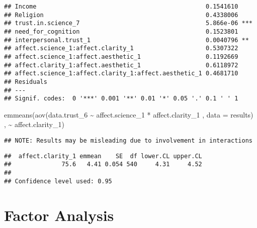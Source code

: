 \documentclass[
]{article}
\newenvironment{Shaded}{\begin{snugshade}}{\end{snugshade}}
\newcommand{\AttributeTok}[1]{\textcolor[rgb]{0.77,0.63,0.00}{#1}}
\newcommand{\FunctionTok}[1]{\textcolor[rgb]{0.00,0.00,0.00}{#1}}
\newcommand{\NormalTok}[1]{#1}
\newcommand{\SpecialCharTok}[1]{\textcolor[rgb]{0.00,0.00,0.00}{#1}}
\begin{document}
\begin{verbatim}
## Income                                               0.1541610    
## Religion                                             0.4338006    
## trust.in.science_7                                   5.866e-06 ***
## need_for_cognition                                   0.1523801    
## interpersonal.trust_1                                0.0040796 ** 
## affect.science_1:affect.clarity_1                    0.5307322    
## affect.science_1:affect.aesthetic_1                  0.1192669    
## affect.clarity_1:affect.aesthetic_1                  0.6118972    
## affect.science_1:affect.clarity_1:affect.aesthetic_1 0.4681710    
## Residuals                                                         
## ---
## Signif. codes:  0 '***' 0.001 '**' 0.01 '*' 0.05 '.' 0.1 ' ' 1
\end{verbatim}

\begin{Shaded}
\begin{Highlighting}[]
\FunctionTok{emmeans}\NormalTok{(}\FunctionTok{aov}\NormalTok{(data.trust\_6 }\SpecialCharTok{\textasciitilde{}}\NormalTok{ affect.science\_1 }\SpecialCharTok{*}\NormalTok{ affect.clarity\_1 , }\AttributeTok{data =}\NormalTok{ results) , }\SpecialCharTok{\textasciitilde{}}\NormalTok{ affect.clarity\_1)}
\end{Highlighting}
\end{Shaded}

\begin{verbatim}
## NOTE: Results may be misleading due to involvement in interactions
\end{verbatim}

\begin{verbatim}
##  affect.clarity_1 emmean    SE  df lower.CL upper.CL
##              75.6   4.41 0.054 540     4.31     4.52
## 
## Confidence level used: 0.95
\end{verbatim}

\hypertarget{factor-analysis}{%
\section{Factor Analysis}\label{factor-analysis}}
\end{document}
